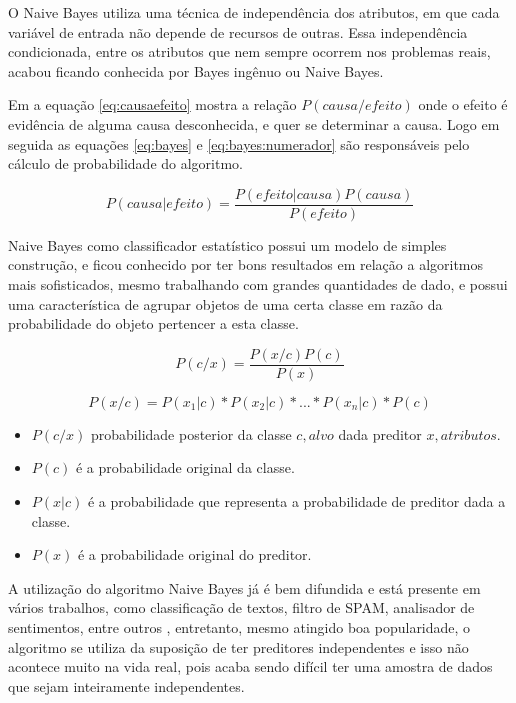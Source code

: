 O Naive Bayes utiliza uma técnica de independência dos atributos, em que cada variável de entrada não depende de recursos de outras. Essa independência condicionada, entre os atributos que nem sempre ocorrem nos problemas reais, acabou ficando conhecida por Bayes ingênuo ou Naive Bayes. 

Em \cite{RusselStuart.Norvig2013} a equação \ref{eq:causaefeito} mostra a relação ${P(causa/efeito)}$ onde o efeito é evidência de alguma causa desconhecida, e quer se determinar a causa. Logo em seguida as equações \ref{eq:bayes} e \ref{eq:bayes:numerador} são responsáveis pelo cálculo de probabilidade do algoritmo.

\begin{equation} \label{eq:causaefeito}
 P(causa|efeito)= \frac{P(efeito|causa)P(causa)}{P(efeito)}
\end{equation}

Naive Bayes como classificador estatístico possui um modelo de simples construção, e ficou conhecido por ter bons resultados em relação a algoritmos mais sofisticados, mesmo trabalhando com grandes quantidades de dado, e possui uma característica de agrupar objetos de uma certa classe em razão da probabilidade do objeto pertencer a esta classe. 

\begin{equation}
 P(c/x)= \frac{P(x/c)P(c)}{P(x)}
\label{eq:bayes}
 \end{equation}

\begin{equation}
 P(x/c)=P(x_1|c)*P(x_2|c)*...*P(x_n|c)*P(c)
 \label{eq:bayes:numerador}
\end{equation}


\begin{itemize}[noitemsep]
 \item ${P(c/x)}$ probabilidade posterior da classe ${c,alvo}$ dada preditor ${x,atributos}$.
 \item ${P(c)}$  é a probabilidade original da classe.
 \item ${P(x|c)}$  é a probabilidade que representa a probabilidade de preditor dada a classe.
 \item ${P(x)}$  é a probabilidade original do preditor.
\end{itemize}

A utilização do algoritmo Naive Bayes já é bem difundida e está presente em vários trabalhos, como classificação de textos, filtro de SPAM, analisador de sentimentos, entre outros \cite{Madureira2017, Lucca2013, Wu2008, Mccallum1997}, entretanto, mesmo atingido boa popularidade, o algoritmo se utiliza da suposição de ter preditores independentes e isso não acontece muito na vida real, pois acaba sendo difícil ter uma amostra de dados que sejam inteiramente independentes. 

